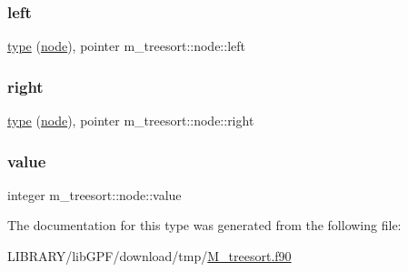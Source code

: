 \subsubsection{\texorpdfstring{left}{left}}
{\footnotesize\ttfamily \hyperlink{stop__watch_83_8txt_a70f0ead91c32e25323c03265aa302c1c}{type} (\hyperlink{structm__treesort_1_1node}{node}), pointer m\+\_\+treesort\+::node\+::left}

\mbox{\label{structm__treesort_1_1node_adfd2c4a14b54fe93048b2d54ed9ed7b6}} 
\subsubsection{\texorpdfstring{right}{right}}
{\footnotesize\ttfamily \hyperlink{stop__watch_83_8txt_a70f0ead91c32e25323c03265aa302c1c}{type} (\hyperlink{structm__treesort_1_1node}{node}), pointer m\+\_\+treesort\+::node\+::right}

\mbox{\label{structm__treesort_1_1node_a8d43ab5fa2b62b0255b0510173508026}} 
\subsubsection{\texorpdfstring{value}{value}}
{\footnotesize\ttfamily integer m\+\_\+treesort\+::node\+::value}



The documentation for this type was generated from the following file\+:\begin{DoxyCompactItemize}
\item 
L\+I\+B\+R\+A\+R\+Y/lib\+G\+P\+F/download/tmp/\hyperlink{M__treesort_8f90}{M\+\_\+treesort.\+f90}\end{DoxyCompactItemize}
